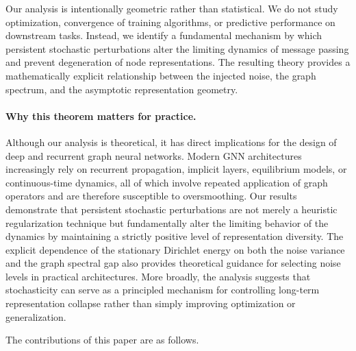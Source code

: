 \documentclass{article}
\begin{document}
Our analysis is intentionally geometric rather than statistical.
We do not study optimization, convergence of training algorithms,
or predictive performance on downstream tasks.
Instead, we identify a fundamental mechanism by which persistent
stochastic perturbations alter the limiting dynamics of message passing
and prevent degeneration of node representations.
The resulting theory provides a mathematically explicit relationship
between the injected noise, the graph spectrum, and the asymptotic
representation geometry.

\paragraph{Why this theorem matters for practice.}
Although our analysis is theoretical, it has direct implications for the
design of deep and recurrent graph neural networks.
Modern GNN architectures increasingly rely on recurrent propagation,
implicit layers, equilibrium models, or continuous-time dynamics, all of
which involve repeated application of graph operators and are therefore
susceptible to oversmoothing.
Our results demonstrate that persistent stochastic perturbations are not
merely a heuristic regularization technique but fundamentally alter the
limiting behavior of the dynamics by maintaining a strictly positive
level of representation diversity.
The explicit dependence of the stationary Dirichlet energy on both the
noise variance and the graph spectral gap also provides theoretical
guidance for selecting noise levels in practical architectures.
More broadly, the analysis suggests that stochasticity can serve as a
principled mechanism for controlling long-term representation collapse
rather than simply improving optimization or generalization.

The contributions of this paper are as follows.
\end{document}
